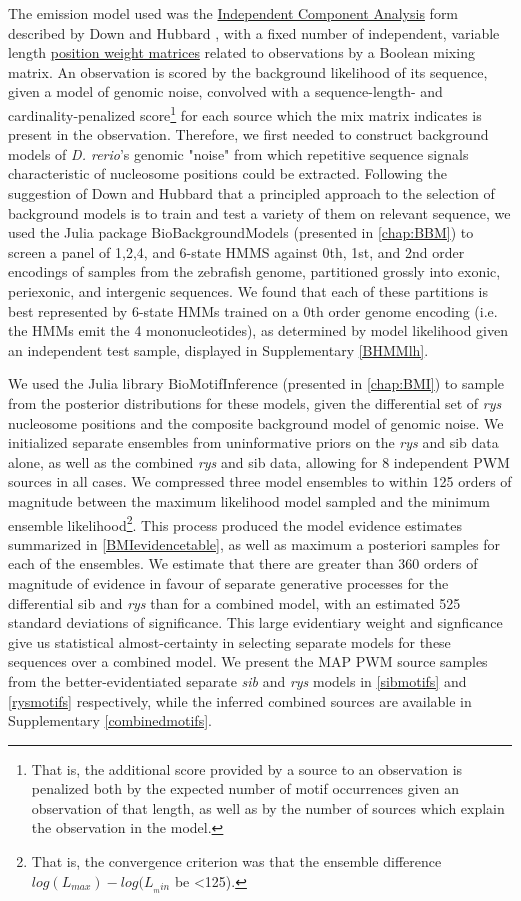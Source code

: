 \documentclass{ut-thesis}
\begin{document}
\begin{NoHyper}
The emission model used was the \hyperref[ssec:ICA]{Independent Component Analysis} form described by Down and Hubbard \cite{Down2005}, with a fixed number of independent, variable length \hyperref[ssec:PWM]{position weight matrices} related to observations by a Boolean mixing matrix. An observation is scored by the background likelihood of its sequence, given a model of genomic noise, convolved with a sequence-length- and cardinality-penalized score\footnote{That is, the additional score provided by a source to an observation is penalized both by the expected number of motif occurrences given an observation of that length, as well as by the number of sources which explain the observation in the model.} for each source which the mix matrix indicates is present in the observation. Therefore, we first needed to construct background models of \textit{D. rerio}'s genomic "noise" from which repetitive sequence signals characteristic of nucleosome positions could be extracted. Following the suggestion of Down and Hubbard \cite{Down2005} that a principled approach to the selection of background models is to train and test a variety of them on relevant sequence, we used the Julia package BioBackgroundModels (presented in \autoref{chap:BBM}) to screen a panel of 1,2,4, and 6-state HMMS against  0th, 1st, and 2nd order encodings of samples from the zebrafish genome, partitioned grossly into exonic, periexonic, and intergenic sequences. We found that each of these partitions is best represented by 6-state HMMs trained on a 0th order genome encoding (i.e. the HMMs emit the 4 mononucleotides), as determined by model likelihood given an independent test sample, displayed in Supplementary \autoref{BHMMlh}.

We used the Julia library BioMotifInference (presented in \autoref{chap:BMI}) to sample from the posterior distributions for these models, given the differential set of \textit{rys} nucleosome positions and the composite background model of genomic noise. We initialized separate ensembles from uninformative priors on the \textit{rys} and sib data alone, as well as the combined \textit{rys} and sib data, allowing for 8 independent PWM sources in all cases. We compressed three model ensembles to within 125 orders of magnitude between the maximum likelihood model sampled and the minimum ensemble likelihood\footnote{That is, the convergence criterion was that the ensemble difference $log(L_{max})-log(L_{_min}$ be <125).}. This process produced the model evidence estimates summarized in \autoref{BMIevidencetable}, as well as maximum a posteriori samples for each of the ensembles. We estimate that there are greater than 360 orders of magnitude of evidence in favour of separate generative processes for the differential sib and \textit{rys} than for a combined model, with an estimated 525 standard deviations of significance. This large evidentiary weight and signficance give us statistical almost-certainty in selecting separate models for these sequences over a combined model. We present the MAP PWM source samples from the better-evidentiated separate \textit{sib} and \textit{rys} models in \autoref{sibmotifs} and \autoref{rysmotifs} respectively, while the inferred combined sources are available in Supplementary \autoref{combinedmotifs}.


\end{NoHyper}
\end{document}
